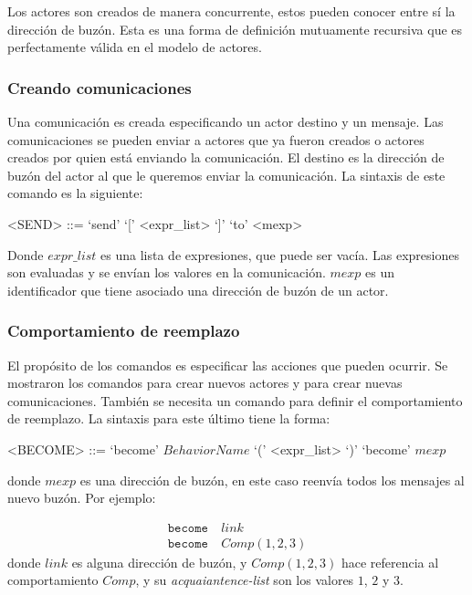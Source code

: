 Los actores son creados de manera concurrente, estos pueden conocer entre sí la dirección de buzón. Esta es una forma de definición mutuamente recursiva que es perfectamente válida en el modelo de actores. 


\subsubsection*{Creando comunicaciones}
Una comunicación es creada especificando un actor destino y un mensaje. Las comunicaciones se pueden enviar a actores que ya fueron creados o actores creados por quien está enviando la comunicación. El destino es la dirección de buzón del actor al que le queremos enviar la comunicación. La sintaxis de este comando es la siguiente:

\begin{grammar}
  <SEND> ::= `send' `[' <expr_list> `]' `to' <mexp>  
\end{grammar}

Donde $expr\_list$ es una lista de expresiones, que puede ser vacía. Las expresiones son evaluadas y se envían los valores en la comunicación. $mexp$ es un identificador que tiene asociado una dirección de buzón de un actor. 

\subsubsection*{Comportamiento de reemplazo}

El propósito de los comandos es especificar las acciones que pueden ocurrir. Se mostraron los comandos para crear nuevos actores y para crear nuevas comunicaciones. También se necesita un comando para definir el comportamiento de reemplazo. La sintaxis para este último tiene la forma:

\begin{grammar}
  <BECOME> ::= `become' $BehaviorName$ `(' <expr_list> `)'
  \alt `become' $mexp$
\end{grammar}

donde $mexp$ es una dirección de buzón, en este caso reenvía todos los mensajes al nuevo buzón.  Por ejemplo:

\begin{align*}
 \texttt{become}&\ link \\
 \texttt{become}&\ Comp(1,2,3) 
\end{align*}
donde $link$ es alguna dirección de buzón, y $Comp(1,2,3)$ hace referencia al comportamiento $Comp$, y su \textit{acquaiantence-list} son los valores $1$, $2$ y $3$. 

